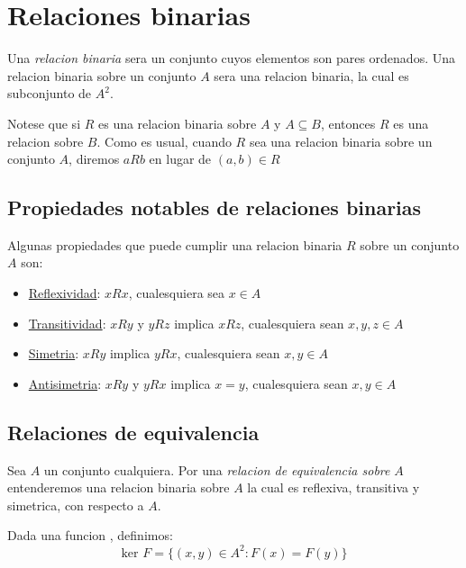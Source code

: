 
\section{Relaciones binarias}

\begin{definition}

  Una \emph{relacion binaria} sera un conjunto cuyos elementos son pares ordenados. Una relacion
  binaria sobre un conjunto $A$ sera una relacion binaria, la cual es subconjunto de $A^2$.

  Notese que si $R$ es una relacion binaria sobre $A$ y $A \subseteq B$, entonces $R$ es una
  relacion sobre $B$. Como es usual, cuando $R$ sea una relacion binaria sobre un conjunto
  $A$, diremos $aRb$ en lugar de $(a, b) \in R$
\end{definition}


\subsection{Propiedades notables de relaciones binarias}
Algunas propiedades que puede cumplir una relacion binaria $R$ sobre un conjunto $A$ son:
\begin{itemize}
  \item \underline{Reflexividad}: $xRx$, cualesquiera sea $x \in A$
  \item \underline{Transitividad}: $xRy$ y $yRz$ implica $xRz$, cualesquiera sean $x,y,z \in A$
  \item \underline{Simetria}: $xRy$ implica $yRx$, cualesquiera sean $x,y \in A$
  \item \underline{Antisimetria}: $xRy$ y $yRx$ implica $x=y$, cualesquiera sean $x,y \in A$
\end{itemize}


\subsection{Relaciones de equivalencia}
\begin{definition}
  Sea $A$ un conjunto cualquiera. Por una \emph{relacion de equivalencia sobre} $A$ entenderemos
  una relacion binaria sobre $A$ la cual es reflexiva, transitiva y simetrica, con respecto a $A$.
\end{definition}

\begin{definition}
  Dada una funcion , definimos:
  $$
  \text{ker }F = \{(x, y) \in A^2 : F(x) = F(y)\}
  $$
\end{definition}

